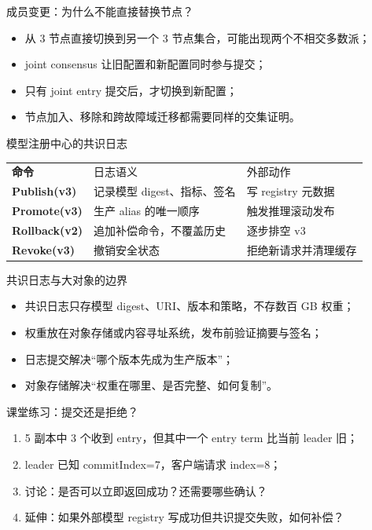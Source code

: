 \documentclass[UTF8,fontset=none,aspectratio=169,10pt]{beamer}
\begin{document}
\begin{frame}{成员变更：为什么不能直接替换节点？}
\begin{itemize}
  \item 从 3 节点直接切换到另一个 3 节点集合，可能出现两个不相交多数派；
  \item joint consensus 让旧配置和新配置同时参与提交；
  \item 只有 joint entry 提交后，才切换到新配置；
  \item 节点加入、移除和跨故障域迁移都需要同样的交集证明。
\end{itemize}
\end{frame}

\begin{frame}{模型注册中心的共识日志}
\begin{tabularx}{\linewidth}{>{\bfseries}p{2.8cm}XX}
\toprule
命令 & 日志语义 & 外部动作 \\
Publish(v3) & 记录模型 digest、指标、签名 & 写 registry 元数据 \\
Promote(v3) & 生产 alias 的唯一顺序 & 触发推理滚动发布 \\
Rollback(v2) & 追加补偿命令，不覆盖历史 & 逐步排空 v3 \\
Revoke(v3) & 撤销安全状态 & 拒绝新请求并清理缓存 \\
\bottomrule
\end{tabularx}
\end{frame}

\begin{frame}{共识日志与大对象的边界}
\begin{itemize}
  \item 共识日志只存模型 digest、URI、版本和策略，不存数百 GB 权重；
  \item 权重放在对象存储或内容寻址系统，发布前验证摘要与签名；
  \item 日志提交解决“哪个版本先成为生产版本”；
  \item 对象存储解决“权重在哪里、是否完整、如何复制”。
\end{itemize}
\end{frame}

\begin{frame}{课堂练习：提交还是拒绝？}
\begin{enumerate}
  \item 5 副本中 3 个收到 entry，但其中一个 entry term 比当前 leader 旧；
  \item leader 已知 commitIndex=7，客户端请求 index=8；
  \item 讨论：是否可以立即返回成功？还需要哪些确认？
  \item 延伸：如果外部模型 registry 写成功但共识提交失败，如何补偿？
\end{enumerate}
\vfill
{}
\end{frame}
\end{document}
